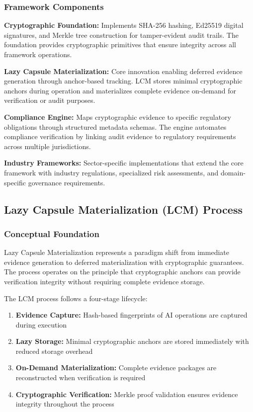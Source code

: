 \documentclass[12pt,a4paper]{article}
\begin{document}
\subsubsection{Framework Components}

\textbf{Cryptographic Foundation:} Implements SHA-256 hashing, Ed25519 digital signatures, and Merkle tree construction for tamper-evident audit trails. The foundation provides cryptographic primitives that ensure integrity across all framework operations.

\textbf{Lazy Capsule Materialization:} Core innovation enabling deferred evidence generation through anchor-based tracking. LCM stores minimal cryptographic anchors during operation and materializes complete evidence on-demand for verification or audit purposes.

\textbf{Compliance Engine:} Maps cryptographic evidence to specific regulatory obligations through structured metadata schemas. The engine automates compliance verification by linking audit evidence to regulatory requirements across multiple jurisdictions.

\textbf{Industry Frameworks:} Sector-specific implementations that extend the core framework with industry regulations, specialized risk assessments, and domain-specific governance requirements.

\subsection{Lazy Capsule Materialization (LCM) Process}

\subsubsection{Conceptual Foundation}

Lazy Capsule Materialization represents a paradigm shift from immediate evidence generation to deferred materialization with cryptographic guarantees. The process operates on the principle that cryptographic anchors can provide verification integrity without requiring complete evidence storage.

The LCM process follows a four-stage lifecycle:

\begin{enumerate}
\item \textbf{Evidence Capture:} Hash-based fingerprints of AI operations are captured during execution
\item \textbf{Lazy Storage:} Minimal cryptographic anchors are stored immediately with reduced storage overhead
\item \textbf{On-Demand Materialization:} Complete evidence packages are reconstructed when verification is required
\item \textbf{Cryptographic Verification:} Merkle proof validation ensures evidence integrity throughout the process
\end{enumerate}
\end{document}
